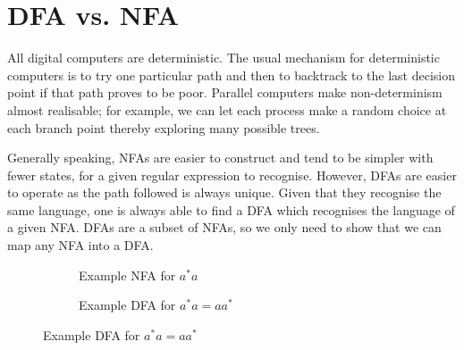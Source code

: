 \section{DFA vs. NFA}
All digital computers are deterministic. The usual mechanism for deterministic computers is to try one particular path and then to backtrack to the last decision point if that path proves to be poor. Parallel computers make non-determinism almost realisable; for example, we can let each process make a random choice at each branch point thereby exploring many possible trees. 



Generally speaking, NFAs are easier to construct and tend to be simpler with fewer states, for a given regular expression to recognise. However, DFAs are easier to operate as the path followed is always unique. Given that they recognise the same language, one is always able to find a DFA which recognises the language of a given NFA. DFAs are a subset of NFAs, so we only need to show that we can map any NFA into a DFA.

\begin{figure}[H]
\begin{minipage}[H]{0.45\textwidth}
\begin{figure}[H]
    \centering
    \caption{Example NFA for $a^*a$}
    \label{fig:nfa-fordfavsnfa}
\end{figure}
\end{minipage}\hfill
\begin{minipage}[H]{0.45\textwidth}
\begin{figure}[H]
    \centering
    \caption{Example DFA for $a^*a = aa^*$}
    \label{fig:dfa-fordfavsnfa}
\end{figure}
\end{minipage}    
\end{figure}

